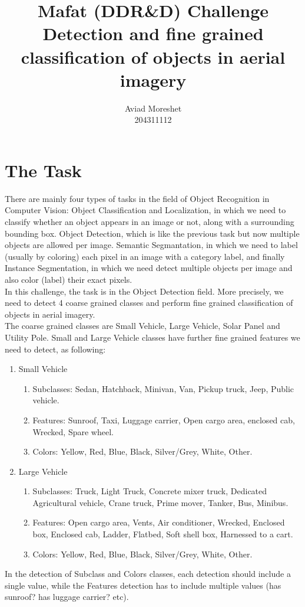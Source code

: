 \documentclass[]{article}
\title{Mafat (DDR\&D) Challenge\\
	Detection and fine grained classification of objects in aerial imagery
	}
\author{Aviad Moreshet\\204311112}
\begin{document}
\date{}
\maketitle


\section{The Task}
There are mainly four types of tasks in the field of Object Recognition in Computer Vision: Object Classification and Localization, in which we need to classify whether an object appears in an image or not, along with a surrounding bounding box. Object Detection, which is like the previous task but now multiple objects are allowed per image. Semantic Segmantation, in which we need to label (usually by coloring) each pixel in an image with a category label, and finally Instance Segmentation, in which we need detect multiple objects per image and also color (label) their exact pixels.\\
In this challenge, the task is in the Object Detection field. More precisely, we need to detect 4 coarse grained classes and perform fine grained classification of objects in aerial imagery.\\
The coarse grained classes are Small Vehicle, Large Vehicle, Solar Panel and Utility Pole. Small and Large Vehicle classes have further fine grained features we need to detect, as following:\\
\begin{enumerate}
\item Small Vehicle
	\begin{enumerate}
		\item Subclasses: Sedan, Hatchback, Minivan, Van, Pickup truck, Jeep, Public vehicle.
		\item Features: Sunroof, Taxi, Luggage carrier, Open cargo area, enclosed cab, Wrecked, Spare wheel.
		\item Colors: Yellow, Red, Blue, Black, Silver/Grey, White, Other.
	\end{enumerate}
\item Large Vehicle
	\begin{enumerate}
	\item Subclasses: Truck, Light Truck, Concrete mixer truck, Dedicated Agricultural vehicle, Crane truck, Prime mover, Tanker, Bus, Minibus.
	\item Features: Open cargo area, Vents, Air conditioner, Wrecked, Enclosed box, Enclosed cab, Ladder, Flatbed, Soft shell box, Harnessed to a cart.
	\item Colors: Yellow, Red, Blue, Black, Silver/Grey, White, Other.
	\end{enumerate}
\end{enumerate}
In the detection of Subclass and Colors classes, each detection should include a single value, while the Features detection has to include multiple values (has sunroof? has luggage carrier? etc).
\end{document}
